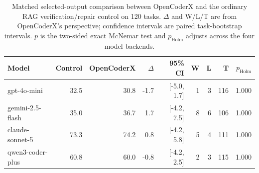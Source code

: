 \begin{table}[t]
\centering
\small
\caption{Matched selected-output comparison between OpenCoderX and the ordinary RAG verification/repair control on 120 tasks. $\Delta$ and W/L/T are from OpenCoderX's perspective; confidence intervals are paired task-bootstrap intervals. $p$ is the two-sided exact McNemar test and $p_{\mathrm{Holm}}$ adjusts across the four model backends.}
\label{tab:exec120_matched}
\begin{tabular}{lrrrrrrrr}
\toprule
Model & Control & OpenCoderX & $\Delta$ & 95\% CI & W & L & T & $p_{\mathrm{Holm}}$ \\
\midrule
gpt-4o-mini & 32.5 & 30.8 & -1.7 & [-5.0, 1.7] & 1 & 3 & 116 & 1.000 \\
gemini-2.5-flash & 35.0 & 36.7 & 1.7 & [-4.2, 7.5] & 8 & 6 & 106 & 1.000 \\
claude-sonnet-5 & 73.3 & 74.2 & 0.8 & [-4.2, 5.8] & 5 & 4 & 111 & 1.000 \\
qwen3-coder-plus & 60.8 & 60.0 & -0.8 & [-4.2, 2.5] & 2 & 3 & 115 & 1.000 \\
\bottomrule
\end{tabular}
\end{table}
